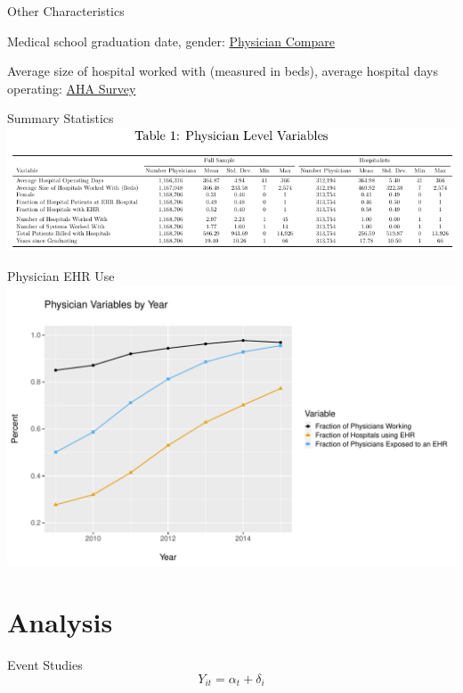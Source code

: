 \documentclass[10pt]{beamer}
\begin{document}
\begin{frame}{Other Characteristics}

Medical school graduation date, gender: \underline{Physician Compare}

\vspace{5mm}

Average size of hospital worked with (measured in beds), average hospital days operating: \underline{AHA Survey}
\end{frame}

\begin{frame}{Summary Statistics}
\centering
    \includegraphics[scale=.8]{Objects/sumstats.pdf}
\end{frame}

\begin{frame}{Physician EHR Use}
    \centering
    \includegraphics[scale=.5]{Objects/sum_stats_year.pdf}
\end{frame}


\section{Analysis}

\begin{frame}{Event Studies}
\begin{equation*}
    Y_{it}=\alpha_t+\delta_i
\end{equation*}

    
\end{frame}
\end{document}
